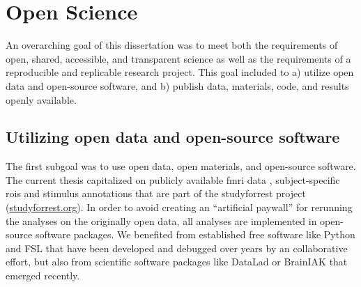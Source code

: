 \section{Open Science}


%
An overarching goal of this dissertation was to meet both the requirements of
open, shared, accessible, and transparent science \citep[cf.][]{watson2015will,
fecher2014open} as well as the requirements of a reproducible and replicable
research project. This goal included to a) utilize open data and open-source
software, and b) publish data, materials, code, and results openly available.


\subsection{Utilizing open data and open-source software}


%
The first subgoal was to use open data, open materials, and open-source
software.
%
The current thesis capitalized on publicly available
%
\ac{fmri} data \citep{hanke2014audiomovie, hanke2016simultaneous,
sengupta2016extension},
%
subject-specific \acp{roi} \citep{sengupta2016extension} and
%
stimulus annotations \citep{haeusler2016cutanno}
%
that are part of the studyforrest project
(\href{www.studyforrest.org}{\url{studyforrest.org}}).
%
In order to avoid creating an ``artificial paywall'' for rerunning the analyses
on the originally open data, all analyses are implemented in open-source
software packages.
%
We benefited from established free software like
%
Python and
%
FSL \citep[\href{https://www.fmrib.ox.ac.uk/fsl}{FMRIB's Software
Library;}][]{smith2004fsl} that have been developed and debugged over years by
an collaborative effort,
%
but also from scientific software packages like
%
DataLad
\citep[\href{www.datalad.org}{\url{datalad.org}};][]{halchenko2021datalad} or
%
BrainIAK
\citep[\href{https://brainiak.org}{\url{brainiak.org}};][]{kumar2020brainiak,
kumar2020brainiaktutorial}
%
that emerged recently.

